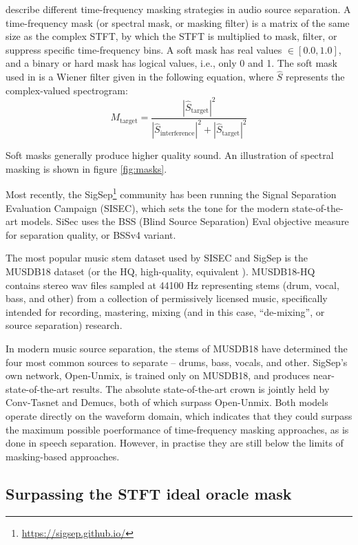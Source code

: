 \documentclass[letter,12pt,notitlepage]{article}
\begin{document}
\citet{masking} describe different time-frequency masking strategies in audio source separation. A time-frequency mask (or spectral mask, or masking filter) is a matrix of the same size as the complex STFT, by which the STFT is multiplied to mask, filter, or suppress specific time-frequency bins. A soft mask has real values $\in [0.0, 1.0]$, and a binary or hard mask has logical values, i.e., only 0 and 1. The soft mask used in \cite{fitzgerald1, fitzgerald2} is a Wiener filter given in the following equation, where $\hat{S}$ represents the complex-valued spectrogram:
\[ M_{\text{target}} = \frac{|\hat{S}_{\text{target}}|^{2}}{|\hat{S}_{\text{interference}}|^{2} + |\hat{S}_{\text{target}}|^{2}} \]

Soft masks generally produce higher quality sound. An illustration of spectral masking is shown in figure \ref{fig:masks}.

Most recently, the SigSep\footnote{\url{https://sigsep.github.io/}} community has been running the Signal Separation Evaluation Campaign (SISEC), which sets the tone for the modern state-of-the-art models. SiSec uses the BSS (Blind Source Separation) Eval \cite{bss} objective measure for separation quality, or BSSv4 variant.

The most popular music stem dataset used by SISEC and SigSep is the MUSDB18 dataset \cite{musdb18} (or the HQ, high-quality, equivalent \cite{musdb18-hq}). MUSDB18-HQ contains stereo wav files sampled at 44100 Hz representing stems (drum, vocal, bass, and other) from a collection of permissively licensed music, specifically intended for recording, mastering, mixing (and in this case, ``de-mixing'', or source separation) research.

In modern music source separation, the stems of MUSDB18 have determined the four most common sources to separate -- drums, bass, vocals, and other. SigSep's own network, Open-Unmix, is trained only on MUSDB18, and produces near-state-of-the-art results. The absolute state-of-the-art crown is jointly held by Conv-Tasnet and Demucs, both of which surpass Open-Unmix. Both models operate directly on the waveform domain, which indicates that they could surpass the maximum possible poerformance of time-frequency masking approaches, as is done in speech separation. However, in practise they are still below the limits of masking-based approaches.

\subsection{Surpassing the STFT ideal oracle mask}
\end{document}
